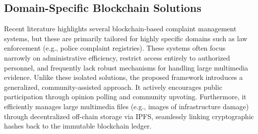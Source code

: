 \subsection{Domain-Specific Blockchain Solutions}
Recent literature highlights several blockchain-based complaint management systems, but these are primarily tailored for highly specific domains such as law enforcement (e.g., police complaint registries). These systems often focus narrowly on administrative efficiency, restrict access entirely to authorized personnel, and frequently lack robust mechanisms for handling large multimedia evidence.
Unlike these isolated solutions, the proposed framework introduces a generalized, community-assisted approach. It actively encourages public participation through opinion polling and community upvoting. Furthermore, it efficiently manages large multimedia files (e.g., images of infrastructure damage) through decentralized off-chain storage via \ac{IPFS}, seamlessly linking cryptographic hashes back to the immutable blockchain ledger.
